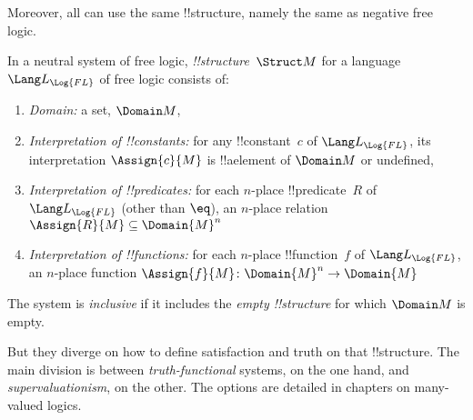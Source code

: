 \documentclass[../../../include/open-logic-section]{subfiles}
\begin{document}
Moreover, all can use the same !!{structure}, namely the same as
negative free logic. 

\begin{defn}
In a neutral system of free logic,  
\emph{!!{structure}}~$\Struct M$ for a language
$\Lang L_{\Log{FL}}$ of free logic consists of:
\begin{enumerate}
\item \emph{Domain:} a set, $\Domain M$,
\item \emph{Interpretation of !!{constant}s:} for any !!{constant}~$c$ of
  $\Lang L_{\Log{FL}}$, its interpretation $\Assign{c}{M}$ is !!a{element} of 
  $\Domain M$ or undefined,
\item \emph{Interpretation of !!{predicate}s:} for each $n$-place
  !!{predicate}~$R$ of $\Lang L_{\Log{FL}}$ (other than $\eq$), an $n$-place
  relation $\Assign{R}{M} \subseteq \Domain{M}^n$
\item \emph{Interpretation of !!{function}s:} for each $n$-place
  !!{function}~$f$ of $\Lang L_{\Log{FL}}$, an $n$-place function $\Assign{f}{M}
  \colon \Domain{M}^n \to \Domain{M}$
\end{enumerate}
The system is \emph{inclusive} if it includes the \emph{empty !!{structure}}
for which $\Domain M$ is empty. 
\end{defn}

But they diverge on how to define satisfaction and truth on that !!{structure}.
The main division is between \emph{truth-functional} systems, on the one hand,
and \emph{supervaluationism}, on the other. The options are detailed in chapters
on many-valued logics. 
\end{document}

